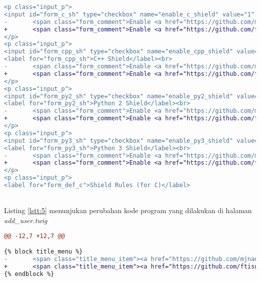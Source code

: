 \begin{lstlisting}[language=diff, caption=Perubahan kode program pada halaman \textit{settings.twig}, label=lstt:4, basicstyle=\ttfamily, frame=single,
columns=fullflexible, keepspaces=true, breaklines=true]
<p class="input_p">
<input id="form_c_sh" type="checkbox" name="enable_c_shield" value="1" {{ enable_c_shield ? 'checked' }}/> <label for="form_c_sh">C Shield</label><br>
-       <span class="form_comment">Enable <a href="https://github.com/mjnaderi/Sharif-Judge/blob/docs/v1.4/shield.md" target="_blank">Shield</a> for C</span>
+       <span class="form_comment">Enable <a href="https://github.com/ftisunpar/Sharif-Judge/blob/docs/v1.4/shield.md" target="_blank">Shield</a> for C</span>
</p>
<p class="input_p">
<input id="form_cpp_sh" type="checkbox" name="enable_cpp_shield" value="1" {{ enable_cpp_shield ? 'checked' }}/>
<label for="form_cpp_sh">C++ Shield</label><br>
-       <span class="form_comment">Enable <a href="https://github.com/mjnaderi/Sharif-Judge/blob/docs/v1.4/shield.md" target="_blank">Shield</a> for C++</span>
+       <span class="form_comment">Enable <a href="https://github.com/ftisunpar/Sharif-Judge/blob/docs/v1.4/shield.md" target="_blank">Shield</a> for C++</span>
</p>
<p class="input_p">
<input id="form_py2_sh" type="checkbox" name="enable_py2_shield" value="1" {{ enable_py2_shield ? 'checked' }}/>
<label for="form_py2_sh">Python 2 Shield</label><br>
-       <span class="form_comment">Enable <a href="https://github.com/mjnaderi/Sharif-Judge/blob/docs/v1.4/shield.md" target="_blank">Shield</a> for Python 2</span>
+       <span class="form_comment">Enable <a href="https://github.com/ftisunpar/Sharif-Judge/blob/docs/v1.4/shield.md" target="_blank">Shield</a> for Python 2</span>
</p>
<p class="input_p">
<input id="form_py3_sh" type="checkbox" name="enable_py3_shield" value="1" {{ enable_py3_shield ? 'checked' }}/>
<label for="form_py3_sh">Python 3 Shield</label><br>
-       <span class="form_comment">Enable <a href="https://github.com/mjnaderi/Sharif-Judge/blob/docs/v1.4/shield.md" target="_blank">Shield</a> for Python 3</span>
+       <span class="form_comment">Enable <a href="https://github.com/ftisunpar/Sharif-Judge/blob/docs/v1.4/shield.md" target="_blank">Shield</a> for Python 3</span>
</p>
<p class="input_p">
<label for="form_def_c">Shield Rules (for C)</label>
\end{lstlisting}
~\\	
	Listing \ref{lstt:5} menunjukan perubahan kode program yang dilakukan di halaman \textit{add\_user.twig}
\begin{lstlisting}[language=diff, caption=Perubahan kode program pada halaman \textit{add\_user.twig}, label=lstt:5, basicstyle=\ttfamily, frame=single,
columns=fullflexible, keepspaces=true, breaklines=true]
@@ -12,7 +12,7 @@

{% block title_menu %}
-       <span class="title_menu_item"><a href="https://github.com/mjnaderi/Sharif-Judge/blob/docs/v1.4/users.md#add-users" target="_blank"><i class="fa fa-question-circle color6"></i> Help</a></span>
+       <span class="title_menu_item"><a href="https://github.com/ftisunpar/Sharif-Judge/blob/docs/v1.4/users.md#add-users" target="_blank"><i class="fa fa-question-circle color6"></i> Help</a></span>
{% endblock %}
\end{lstlisting}
